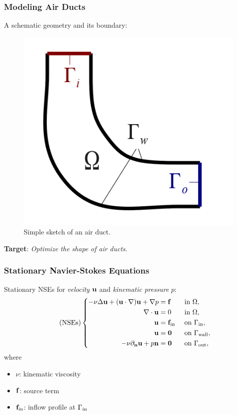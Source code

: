 \documentclass[10pt,xcolor=table,english]{beamer}   %
\begin{document}
\begin{frame}
    \frametitle{Modeling Air Ducts}
    
    A schematic geometry and its boundary:
    \begin{figure}
        \centering
        \includegraphics[scale=1]{Geometry_Simple_Sketch}
        \caption{Simple sketch of an air duct.}
    \end{figure}
    \vspace{1cm}
    
    \textbf{Target}: \textit{Optimize the shape of air ducts}.
\end{frame}

\begin{frame}
    \frametitle{Stationary Navier-Stokes Equations}
    Stationary NSEs for \textit{velocity} ${\bf u}$ and \textit{kinematic pressure} $p$:
    \begin{equation}
    \label{NSEs}
    \tag{NSEs}
    \left\{\begin{split}
    - \nu\Delta{\bf u} + ({\bf u}\cdot\nabla){\bf u} + \nabla p &= {\bf f} &&\mbox{ in } \Omega,\\
    \nabla\cdot{\bf u} &= 0 &&\mbox{ in } \Omega,\\
    {\bf u} &= {\bf f}_{\rm in} &&\mbox{ on } \Gamma_{\rm in},\\
    {\bf u} &= {\bf 0} &&\mbox{ on } \Gamma_{\rm wall},\\
    -\nu\partial_{\bf n}{\bf u} + p{\bf n} &= {\bf 0} &&\mbox{ on } \Gamma_{\rm out},
    \end{split}\right.    
    \end{equation}
    where
    \begin{itemize}
        \item $\nu$: kinematic viscosity
        \item ${\bf f}$: source term
        \item ${\bf f}_{\rm in}$: inflow profile at $\Gamma_{\rm in}$
    \end{itemize}    
\end{frame}
\end{document}
